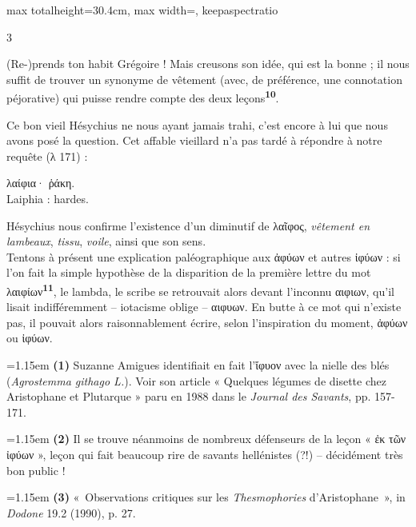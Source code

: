 \documentclass[11pt,twoside]{book}
\newcommand{\italique}[1]{\textit{#1}}
\newcommand{\citComm}[1]{\begin{quoting}[vskip=0.4pt,leftmargin=0.7em,rightmargin=0.2em]#1\end{quoting}}
\newcommand{\latin}[1]{\textit{#1}}
\newcommand{\marqueur}[1]{\textsuperscript{\color{rubricRed}\textbf{#1}}}
\begin{document}
\begin{adjustbox}{max totalheight=30.4cm, max width=\textwidth, keepaspectratio}
\begin{minipage}{\textwidth}
{\begin{multicols}{3}
\par\vspace{1.5pt}
\noindent (Re-)prends ton habit Grégoire ! Mais creusons son idée, qui est la bonne ; il nous suffit de trouver un synonyme de vêtement (avec, de préférence, une connotation péjorative) qui puisse rendre compte des deux leçons\marqueur{10}.
\par\vspace{1.5pt}
\noindent Ce bon vieil Hésychius ne nous ayant jamais trahi, c'est encore à lui que nous avons posé la question. Cet affable vieillard n'a pas tardé à répondre à notre requête (λ 171) :
\citComm{λαίφια· ῥάκη.\\
Laiphia : hardes.}
\par\vspace{1.5pt}
\noindent Hésychius nous confirme l'existence d'un diminutif de λαῖφος, \italique{vêtement en lambeaux}, \italique{tissu}, \italique{voile}, ainsi que son sens.\\ Tentons à présent une explication paléographique aux ἀφύων et autres ἰφύων : si l'on fait la simple hypothèse de la disparition de la première lettre du mot λαιφίων\marqueur{11}, le lambda, le scribe se retrouvait alors devant l'inconnu αιφιων, qu'il lisait indifféremment – iotacisme oblige – αιφυων. En butte à ce mot qui n'existe pas, il pouvait alors raisonnablement écrire, selon l'inspiration du moment, ἀφύων ou ἰφύων.
\par\vspace{1.5pt}
\par\vspace{1.2pt}\par\nopagebreak\vspace{1pt}\noindent\hangindent=1.15em {\color{sepiaNote}\textbf{(1)}} Suzanne Amigues identifiait en fait l'ἴφυον avec la nielle des blés (\latin{Agrostemma githago L.}). Voir son article « Quelques légumes de disette chez Aristophane et Plutarque » paru en 1988 dans le \italique{Journal des Savants}, pp. 157-171.
\par\vspace{1.5pt}
\noindent\hangindent=1.15em {\color{sepiaNote}\textbf{(2)}} Il se trouve néanmoins de nombreux défenseurs de la leçon « ἐκ τῶν ἰφύων », leçon qui fait beaucoup rire de savants hellénistes (?!) – décidément très bon public !
\par\vspace{1.5pt}
\noindent\hangindent=1.15em {\color{sepiaNote}\textbf{(3)}} «~Observations critiques sur les \italique{Thesmophories} d'Aristophane~», in \italique{Dodone} 19.2 (1990), p. 27.

\end{multicols}}
\end{minipage}
\end{adjustbox}
\end{document}
